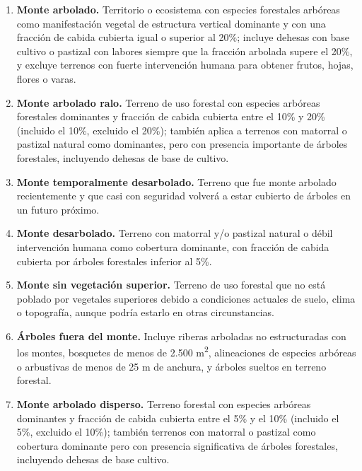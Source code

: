 \begin{enumerate}
    \item \textbf{Monte arbolado.} Territorio o ecosistema con especies forestales arbóreas como manifestación vegetal de estructura vertical dominante y con una fracción de cabida cubierta igual o superior al 20\%; incluye dehesas con base cultivo o pastizal con labores siempre que la fracción arbolada supere el 20\%, y excluye terrenos con fuerte intervención humana para obtener frutos, hojas, flores o varas.

    \item \textbf{Monte arbolado ralo.} Terreno de uso forestal con especies arbóreas forestales dominantes y fracción de cabida cubierta entre el 10\% y 20\% (incluido el 10\%, excluido el 20\%); también aplica a terrenos con matorral o pastizal natural como dominantes, pero con presencia importante de árboles forestales, incluyendo dehesas de base de cultivo.

    \item \textbf{Monte temporalmente desarbolado.} Terreno que fue monte arbolado recientemente y que casi con seguridad volverá a estar cubierto de árboles en un futuro próximo.

    \item \textbf{Monte desarbolado.} Terreno con matorral y/o pastizal natural o débil intervención humana como cobertura dominante, con fracción de cabida cubierta por árboles forestales inferior al 5\%.

    \item \textbf{Monte sin vegetación superior.} Terreno de uso forestal que no está poblado por vegetales superiores debido a condiciones actuales de suelo, clima o topografía, aunque podría estarlo en otras circunstancias.

    \item \textbf{Árboles fuera del monte.} Incluye riberas arboladas no estructuradas con los montes, bosquetes de menos de 2.500 m\textsuperscript{2}, alineaciones de especies arbóreas o arbustivas de menos de 25 m de anchura, y árboles sueltos en terreno forestal.

    \item \textbf{Monte arbolado disperso.} Terreno forestal con especies arbóreas dominantes y fracción de cabida cubierta entre el 5\% y el 10\% (incluido el 5\%, excluido el 10\%); también terrenos con matorral o pastizal como cobertura dominante pero con presencia significativa de árboles forestales, incluyendo dehesas de base cultivo.
\end{enumerate}


